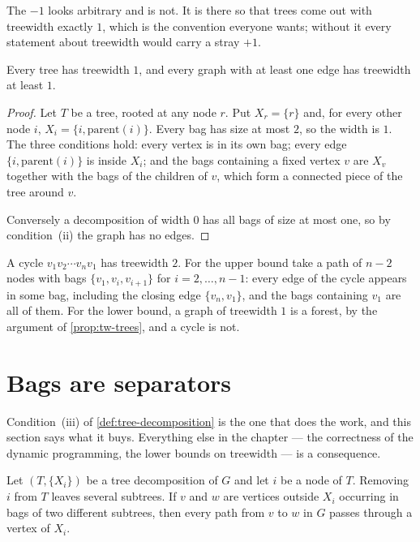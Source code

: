 The $-1$ looks arbitrary and is not. It is there so that trees come out with
treewidth exactly $1$, which is the convention everyone wants; without it every
statement about treewidth would carry a stray $+1$.

\begin{proposition}\label{prop:tw-trees}
Every tree has treewidth $1$, and every graph with at least one edge has
treewidth at least $1$.
\end{proposition}

\begin{proof}
Let $T$ be a tree, rooted at any node $r$. Put $X_r = \{r\}$ and, for every
other node $i$, $X_i = \{i, \mathrm{parent}(i)\}$. Every bag has size at most
$2$, so the width is $1$. The three conditions hold: every vertex is in its own
bag; every edge $\{i,\mathrm{parent}(i)\}$ is inside $X_i$; and the bags
containing a fixed vertex $v$ are $X_v$ together with the bags of the children
of $v$, which form a connected piece of the tree around $v$.

Conversely a decomposition of width $0$ has all bags of size at most one, so by
condition~(ii) the graph has no edges.
\end{proof}

\begin{example}[Cycles]\label{ex:tw-cycle}
A cycle $v_1 v_2 \cdots v_n v_1$ has treewidth $2$. For the upper bound take a
path of $n-2$ nodes with bags $\{v_1, v_i, v_{i+1}\}$ for $i = 2, \ldots, n-1$:
every edge of the cycle appears in some bag, including the closing edge
$\{v_n,v_1\}$, and the bags containing $v_1$ are all of them. For the lower
bound, a graph of treewidth $1$ is a forest, by the argument of
\cref{prop:tw-trees}, and a cycle is not.
\end{example}

\section{Bags are separators}
\label{sec:bags-separators}

Condition~(iii) of \cref{def:tree-decomposition} is the one that does the work,
and this section says what it buys. Everything else in the chapter --- the
correctness of the dynamic programming, the lower bounds on treewidth --- is a
consequence.

\begin{lemma}\label{lem:tw-separator}
Let $(T, \{X_i\})$ be a tree decomposition of $G$ and let $i$ be a node of $T$.
Removing $i$ from $T$ leaves several subtrees. If $v$ and $w$ are vertices
outside $X_i$ occurring in bags of two different subtrees, then every path from
$v$ to $w$ in $G$ passes through a vertex of $X_i$.
\end{lemma}

